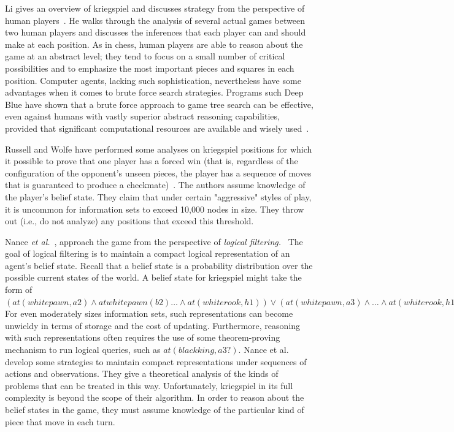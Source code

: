 \documentclass[times, 10pt,twocolumn]{article}
\newcommand{\etal}{{\em et al.}\ }
\begin{document}
Li gives an overview of kriegspiel and discusses strategy from the perspective of human players~\cite{li94chess}.  He
walks through the analysis of several actual games between two human players and discusses the inferences that each
player can and should make at each position.  As in chess, human players are able to reason about the game at an
abstract level; they tend to focus on a small number of critical possibilities and to emphasize the most important
pieces and squares in each position.  Computer agents, lacking such sophistication, nevertheless have some advantages
when it comes to brute force search strategies. Programs such Deep Blue have shown that a brute force approach to game
tree search can be effective, even against humans with vastly superior abstract reasoning capabilities, provided that
significant computational resources are available and wisely used~\cite{campbell02deep}.

Russell and Wolfe have performed some analyses on kriegspiel positions for which it possible to prove that one player
has a forced win (that is, regardless of the configuration of the opponent's unseen pieces, the player has a sequence of
moves that is guaranteed to produce a checkmate)~\cite{russell05efficient, wolfe07exploiting}.  The authors assume
knowledge of the player's belief state.  They claim that under certain "aggressive" styles of play, it is uncommon for
information sets to exceed 10,000 nodes in size.  They throw out (i.e., do not analyze) any positions that exceed this
threshold.  


Nance \etal, approach the game from the perspective of {\em logical filtering.}~\cite{nance06reasoning}  The goal of
logical filtering is to maintain a compact logical representation of an agent's belief state.  Recall that a belief
state is a probability distribution over the possible current states of the world.  A belief state for kriegspiel might
take the form of $(at(whitepawn,a2) \wedge at whitepawn(b2) \ldots \wedge at(whiterook,h1)) \vee (at(whitepawn,a3)
\wedge \ldots \wedge at(whiterook,h1)) \ldots$  For even moderately sizes information sets, such
representations can become unwieldy in terms of storage and the cost of updating.  Furthermore, reasoning with such
representations often requires the use of some theorem-proving mechanism to run logical queries, such
as $at(blackking,a3?)$. Nance et al. develop some strategies to maintain compact representations under
sequences of actions and observations.  They give a theoretical analysis of the kinds of problems that can be treated in
this way.  Unfortunately, kriegspiel in its full complexity is beyond the scope of their algorithm.  In order to reason
about the belief states in the game, they must assume knowledge of the particular kind of piece that move in each turn.
\end{document}
